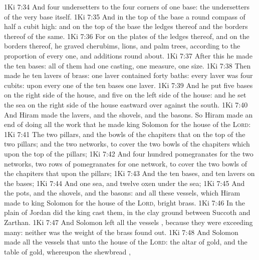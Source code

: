 \vs 1Ki 7:34 And  four undersetters to the four corners of one base:  the undersetters  of the very base itself.
\vs 1Ki 7:35 And in the top of the base  a round compass of half a cubit high: and on the top of the base the ledges thereof and the borders thereof  of the same.
\vs 1Ki 7:36 For on the plates of the ledges thereof, and on the borders thereof, he graved cherubims, lions, and palm trees, according to the proportion of every one, and additions round about.
\vs 1Ki 7:37 After this  he made the ten bases: all of them had one casting, one measure,  one size.
\vs 1Ki 7:38 Then made he ten lavers of brass: one laver contained forty baths:  every laver was four cubits:  upon every one of the ten bases one laver.
\vs 1Ki 7:39 And he put five bases on the right side of the house, and five on the left side of the house: and he set the sea on the right side of the house eastward over against the south.
\vs 1Ki 7:40 And Hiram made the lavers, and the shovels, and the basons. So Hiram made an end of doing all the work that he made king Solomon for the house of the \textsc{Lord}:
\vs 1Ki 7:41 The two pillars, and the  bowls of the chapiters that  on the top of the two pillars; and the two networks, to cover the two bowls of the chapiters which  upon the top of the pillars;
\vs 1Ki 7:42 And four hundred pomegranates for the two networks,  two rows of pomegranates for one network, to cover the two bowls of the chapiters that  upon the pillars;
\vs 1Ki 7:43 And the ten bases, and ten lavers on the bases;
\vs 1Ki 7:44 And one sea, and twelve oxen under the sea;
\vs 1Ki 7:45 And the pots, and the shovels, and the basons: and all these vessels, which Hiram made to king Solomon for the house of the \textsc{Lord},  bright brass.
\vs 1Ki 7:46 In the plain of Jordan did the king cast them, in the clay ground between Succoth and Zarthan.
\vs 1Ki 7:47 And Solomon left all the vessels , because they were exceeding many: neither was the weight of the brass found out.
\vs 1Ki 7:48 And Solomon made all the vessels that  unto the house of the \textsc{Lord}: the altar of gold, and the table of gold, whereupon the shewbread ,
